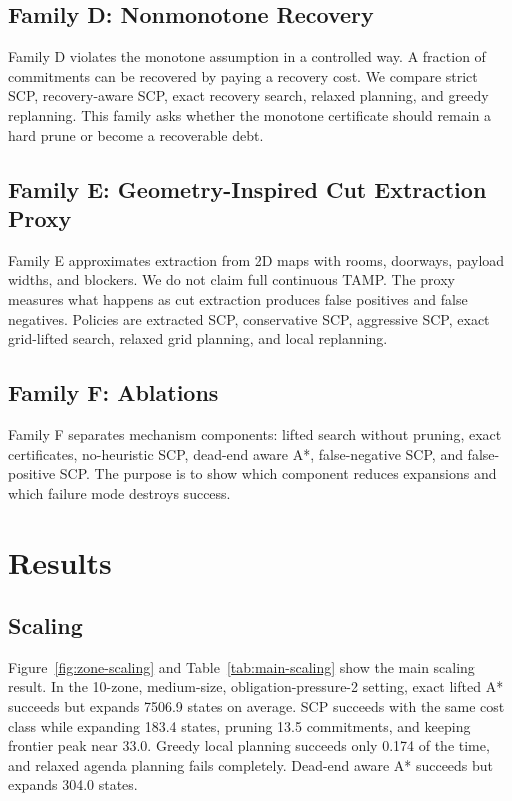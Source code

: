 \documentclass{article}
\begin{document}
\subsection{Family D: Nonmonotone Recovery}

Family D violates the monotone assumption in a controlled way. A fraction of commitments can be recovered by paying a recovery cost. We compare strict SCP, recovery-aware SCP, exact recovery search, relaxed planning, and greedy replanning. This family asks whether the monotone certificate should remain a hard prune or become a recoverable debt.

\subsection{Family E: Geometry-Inspired Cut Extraction Proxy}

Family E approximates extraction from 2D maps with rooms, doorways, payload widths, and blockers. We do not claim full continuous TAMP. The proxy measures what happens as cut extraction produces false positives and false negatives. Policies are extracted SCP, conservative SCP, aggressive SCP, exact grid-lifted search, relaxed grid planning, and local replanning.

\subsection{Family F: Ablations}

Family F separates mechanism components: lifted search without pruning, exact certificates, no-heuristic SCP, dead-end aware A*, false-negative SCP, and false-positive SCP. The purpose is to show which component reduces expansions and which failure mode destroys success.

\section{Results}

\subsection{Scaling}

Figure~\ref{fig:zone-scaling} and Table~\ref{tab:main-scaling} show the main scaling result. In the 10-zone, medium-size, obligation-pressure-2 setting, exact lifted A* succeeds but expands 7506.9 states on average. SCP succeeds with the same cost class while expanding 183.4 states, pruning 13.5 commitments, and keeping frontier peak near 33.0. Greedy local planning succeeds only 0.174 of the time, and relaxed agenda planning fails completely. Dead-end aware A* succeeds but expands 304.0 states.
\end{document}
